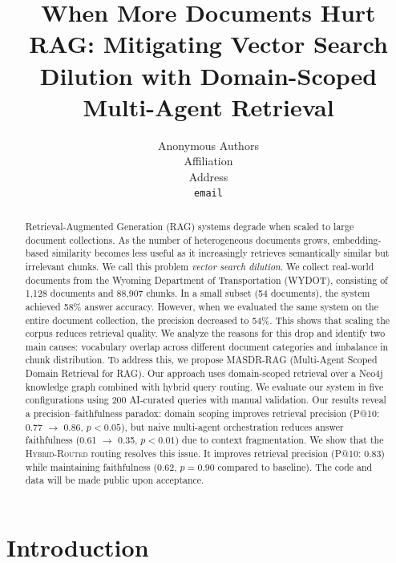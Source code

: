 \documentclass{article}
\title{When More Documents Hurt RAG: Mitigating Vector Search Dilution with Domain-Scoped Multi-Agent Retrieval}
\author{Anonymous Authors \\
Affiliation \\
Address \\
\texttt{email}
}
\newcommand{\systemname}{\textsc{MASDR-RAG}}
\newcommand{\hybridname}{\textsc{Hybrid-Routed}}
\newcommand{\numChunks}{88{,}907}
\newcommand{\numQueries}{200}
\begin{document}
\maketitle

\begin{abstract}
Retrieval-Augmented Generation (RAG) systems degrade when scaled to large document collections. As the number of heterogeneous documents grows, embedding-based similarity becomes less useful as it increasingly retrieves semantically similar but irrelevant chunks. We call this problem \textit{vector search dilution}.
We collect real-world documents from the Wyoming Department of Transportation (WYDOT), consisting of 1,128 documents and \numChunks{} chunks. In a small subset (54 documents), the system achieved 58\% answer accuracy. However, when we evaluated the same system on the entire document collection, the precision decreased to 54\%. This shows that scaling the corpus reduces retrieval quality. We analyze the reasons for this drop and identify two main causes: vocabulary overlap across different document categories and imbalance in chunk distribution. To address this, we propose \systemname{} (Multi-Agent Scoped Domain Retrieval for RAG). Our approach uses domain-scoped retrieval over a Neo4j knowledge graph combined with hybrid query routing. We evaluate our system in five configurations using \numQueries{} AI-curated queries with manual validation. Our results reveal a precision--faithfulness paradox: domain scoping improves retrieval precision (P@10: 0.77 $\rightarrow$ 0.86, $p < 0.05$), but naive multi-agent orchestration reduces answer faithfulness (0.61 $\rightarrow$ 0.35, $p < 0.01$) due to context fragmentation. We show that the \hybridname{} routing resolves this issue. It improves retrieval precision (P@10: 0.83) while maintaining faithfulness (0.62, $p = 0.90$ compared to baseline). The code and data will be made public upon acceptance.

\end{abstract}

\section{Introduction}
\label{sec:introduction}
\end{document}
